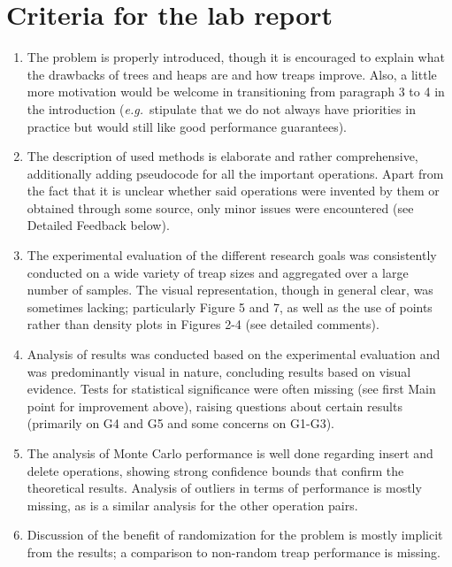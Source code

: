 \documentclass[11pt,a4paper,oneside,fleqn]{article}
\newcommand{\eg}{\emph{e.g.}~}
\begin{document}
\section*{Criteria for the lab report}
\begin{enumerate}[topsep=0pt,itemsep=-1ex,partopsep=1ex,parsep=1ex]
\item The problem is properly introduced, though it is encouraged to explain what the drawbacks of trees and heaps are and how treaps improve. Also, a little more motivation would be welcome in transitioning from paragraph 3 to 4 in the introduction (\eg stipulate that we do not always have priorities in practice but would still like good performance guarantees). 
\item The description of used methods is elaborate and rather comprehensive, additionally adding pseudocode for all the important operations. Apart from the fact that it is unclear whether said operations were invented by them or obtained through some source, only minor issues were encountered (see Detailed Feedback below).
\item The experimental evaluation of the different research goals was consistently conducted on a wide variety of treap sizes and aggregated over a large number of samples. The visual representation, though in general clear, was sometimes lacking; particularly Figure 5 and 7, as well as the use of points rather than density plots in Figures 2-4 (see detailed comments).
\item Analysis of results was conducted based on the experimental evaluation and was predominantly visual in nature, concluding results based on visual evidence. Tests for statistical significance were often missing (see first Main point for improvement above), raising questions about certain results (primarily on G4 and G5 and some concerns on G1-G3).
\item The analysis of Monte Carlo performance is well done regarding insert and delete operations, showing strong confidence bounds that confirm the theoretical results. Analysis of outliers in terms of performance is mostly missing, as is a similar analysis for the other operation pairs.
\item Discussion of the benefit of randomization for the problem is mostly implicit from the results; a comparison to non-random treap performance is missing.
\end{enumerate}
\end{document}
